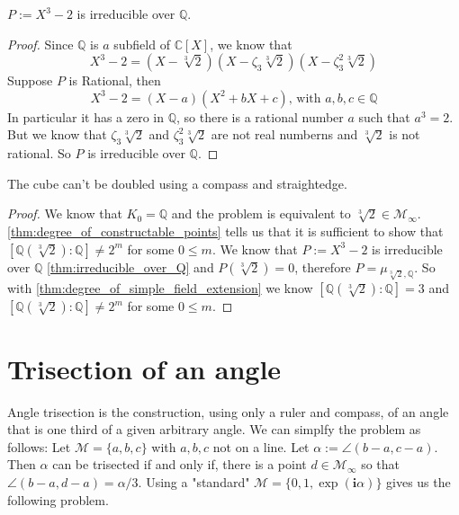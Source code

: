 \begin{theorem}
    $P := X^3 - 2$ is irreducible over $\mathbb{Q}$.
\label{thm:irreducible_over_Q}
\end{theorem}
\begin{proof}
    Since $\mathbb{Q}$ is $a$ subfield of $\mathbb{C} [X]$, we know that
    \begin{equation*}
        X^3 - 2 = (X - \sqrt[3]{2})(X -\zeta_3 \sqrt[3]{2})(X -\zeta_3^2 \sqrt[3]{2})
    \end{equation*}
    Suppose $P$ is Rational, then
    \begin{equation*}
        X^3 - 2 = (X - a)(X^2 + bX + c)\text{, with } a, b, c \in \mathbb{Q}
    \end{equation*}
    In particular it has a zero in $\mathbb{Q}$, so there is a rational number $a$ such that $a^3 = 2$.\newline
    But we know that $\zeta_3 \sqrt[3]{2}$ and $\zeta_3^2 \sqrt[3]{2}$ are not real numberns and $\sqrt[3]{2}$ is not rational.
    So $P$ is irreducible over $\mathbb{Q}$.
\end{proof}
\begin{theorem}
    The cube can't be doubled using a compass and straightedge.
\end{theorem}
\begin{proof}
    We know that $K_0 = \mathbb{Q}$ and the problem is equivalent to $\sqrt[3]{2} \in \mathcal{M}_{\infty}$.\newline
    \ref{thm:degree_of_constructable_points} tells us that it is sufficient to show that $[\mathbb{Q}(\sqrt[3]{2}):\mathbb{Q}] \ne 2^m$ for some $0 \le m $.
    \newline
    We know that $P := X^3 - 2$ is irreducible over $\mathbb{Q}$ \ref{thm:irreducible_over_Q} and $P(\sqrt[3]{2}) = 0$, therefore $P = \mu_{\sqrt[3]{2},\mathbb{Q}}$.
    So with \ref{thm:degree_of_simple_field_extension} we know $[\mathbb{Q}(\sqrt[3]{2}):\mathbb{Q}] = 3$ and $[\mathbb{Q}(\sqrt[3]{2}):\mathbb{Q}] \ne 2^m$ for some $0 \le m $.
\end{proof}

\section{Trisection of an angle}
Angle trisection is the construction, using only a ruler and compass, of an angle that is one third of a given arbitrary angle.
We can simplfy the problem as follows:
Let $\mathcal{M} = \{a, b, c\}$ with $a, b, c$ not on a line. Let $\alpha := \angle (b - a, c - a) $.
Then $\alpha$ can be trisected if and only if, there is a point $d\in \mathcal{M}_{\infty}$ so that $\angle (b - a, d - a) = \alpha/3$. Using a
"standard" $\mathcal{M} = \{0,1,\exp(\textbf{i} \alpha)\}$ gives us the following problem.

